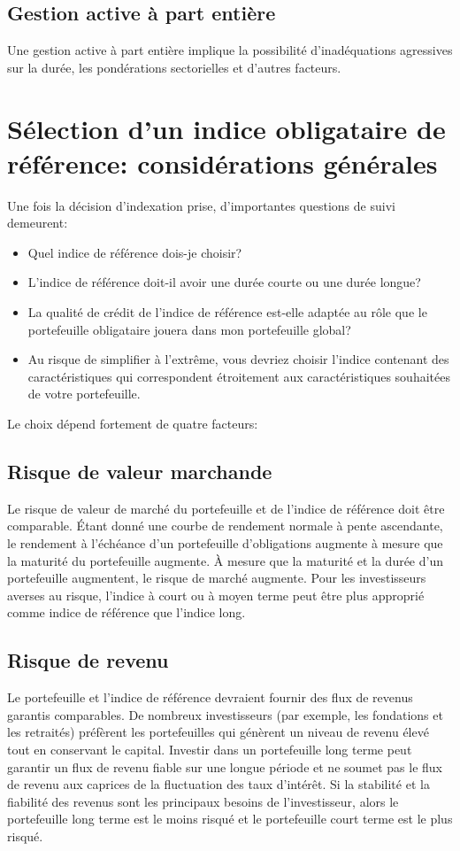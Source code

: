 \documentclass[12pt]{article}
\begin{document}
\subsection{Gestion active à part entière}
Une gestion active à part entière implique la possibilité d'inadéquations agressives sur la durée, les pondérations sectorielles et d'autres facteurs.

\section{Sélection d'un indice obligataire de référence: considérations générales}
Une fois la décision d'indexation prise, d'importantes questions de suivi demeurent:
\begin{itemize}
\item Quel indice de référence dois-je choisir?
\item L'indice de référence doit-il avoir une durée courte ou une durée longue?
\item La qualité de crédit de l’indice de référence est-elle adaptée au rôle que le portefeuille obligataire jouera dans mon portefeuille global?
\item Au risque de simplifier à l'extrême, vous devriez choisir l'indice contenant des caractéristiques qui correspondent étroitement aux caractéristiques souhaitées de votre portefeuille.
\end{itemize}
Le choix dépend fortement de quatre facteurs:
\subsection{Risque de valeur marchande}
Le risque de valeur de marché du portefeuille et de l'indice de référence doit être comparable. Étant donné une courbe de rendement normale à pente ascendante, le rendement à l'échéance d'un portefeuille d'obligations augmente à mesure que la maturité du portefeuille augmente. À mesure que la maturité et la durée d'un portefeuille augmentent, le risque de marché augmente. Pour les investisseurs averses au risque, l'indice à court ou à moyen terme peut être plus approprié comme indice de référence que l'indice long.
\subsection{Risque de revenu}
Le portefeuille et l'indice de référence devraient fournir des flux de revenus garantis comparables. De nombreux investisseurs (par exemple, les fondations et les retraités) préfèrent les portefeuilles qui génèrent un niveau de revenu élevé tout en conservant le capital. Investir dans un portefeuille long terme peut garantir un flux de revenu fiable sur une longue période et ne soumet pas le flux de revenu aux caprices de la fluctuation des taux d'intérêt. Si la stabilité et la fiabilité des revenus sont les principaux besoins de l'investisseur, alors le portefeuille long terme est le moins risqué et le portefeuille court terme est le plus risqué.
\end{document}
